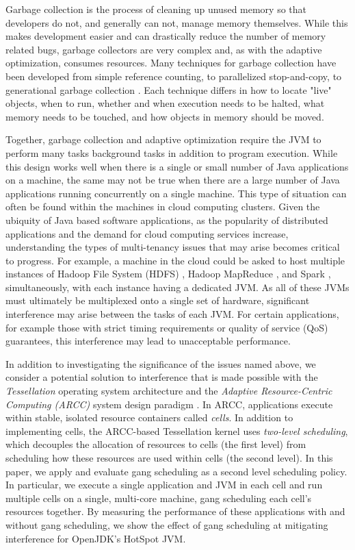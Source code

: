 \documentclass{sig-alternate}
\begin{document}
Garbage collection is the process of cleaning up unused memory so that developers do not, and generally can not, manage memory themselves. While this makes development easier and can drastically reduce the number of memory related bugs, garbage collectors are very complex and, as with the adaptive optimization, consumes resources. Many techniques for garbage collection have been developed from simple reference counting, to parallelized stop-and-copy, to generational garbage collection \cite{lins1996garbage}. Each technique differs in how to locate "live" objects, when to run, whether and when execution needs to be halted, what memory needs to be touched, and how objects in memory should be moved.

Together, garbage collection and adaptive optimization require the JVM to perform many tasks background tasks in addition to program execution. While this design works well when there is a single or small number of Java applications on a machine, the same may not be true when there are a large number of Java applications running concurrently on a single machine. This type of situation can often be found within the machines in cloud computing clusters. Given the ubiquity of Java based software applications, as the popularity of distributed applications and the demand for cloud computing services increase, understanding the types of multi-tenancy issues that may arise becomes critical to progress. For example, a machine in the cloud could be asked to host multiple instances of Hadoop File System (HDFS) \cite{shvachko2010hadoop}, Hadoop MapReduce \cite{bialecki2005hadoop}, and Spark \cite{zaharia2010spark}, simultaneously, with each instance having a dedicated JVM. As all of these JVMs must ultimately be multiplexed onto a single set of hardware, significant interference may arise between the tasks of each JVM. For certain applications, for example those with strict timing requirements or quality of service (QoS) guarantees, this interference may lead to unacceptable performance.

In addition to investigating the significance of the issues named above, we consider a potential solution to interference that is made possible with the \textit{Tessellation} operating system architecture and the \textit{Adaptive Resource-Centric Computing (ARCC)} system design paradigm \cite{colmenares2010resource, colmenares2013tessellation, liu2009tessellation}. In ARCC, applications execute within stable, isolated resource containers called \textit{cells}. In addition to implementing cells, the ARCC-based Tessellation kernel uses \textit{two-level scheduling}, which decouples the allocation of resources to cells (the first level) from scheduling how these resources are used within cells (the second level). In this paper, we apply and evaluate gang scheduling \cite{feitelson1992gang} as a second level scheduling policy. In particular, we execute a single application and JVM in each cell and run multiple cells on a single, multi-core machine, gang scheduling each cell's resources together. By measuring the performance of these applications with and without gang scheduling, we show the effect of gang scheduling at mitigating interference for OpenJDK's HotSpot JVM.
\end{document}
